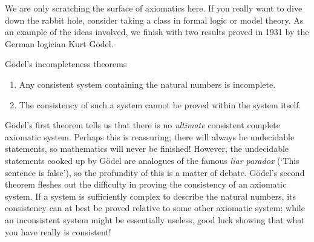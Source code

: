 \vfil

We are only scratching the surface of axiomatics here. If you really want to dive down the rabbit hole, consider taking a class in formal logic or model theory. As an example of the ideas involved, we finish with two results proved in 1931 by the German logician Kurt Gödel.

\begin{thm}{Gödel's incompleteness theorems}{} 
\begin{enumerate}
  \item Any consistent system containing the natural numbers is incomplete.
  \item The consistency of such a system cannot be proved within the system itself.
\end{enumerate}
\end{thm}

Gödel's first theorem tells us that there is no \emph{ultimate} consistent complete axiomatic system. Perhaps this is reassuring; there will always be undecidable statements, so mathematics will never be finished! However, the undecidable statements cooked up by Gödel are analogues of the famous \emph{liar paradox} (`This sentence is false'), so the profundity of this is a matter of debate.\smallbreak
Gödel's second theorem fleshes out the difficulty in proving the consistency of an axiomatic system. If a system is sufficiently complex to describe the natural numbers, its consistency can at best be proved relative to some other axiomatic system; while an inconsistent system might be essentially useless, good luck showing that what you have really is consistent!
\goodbreak

